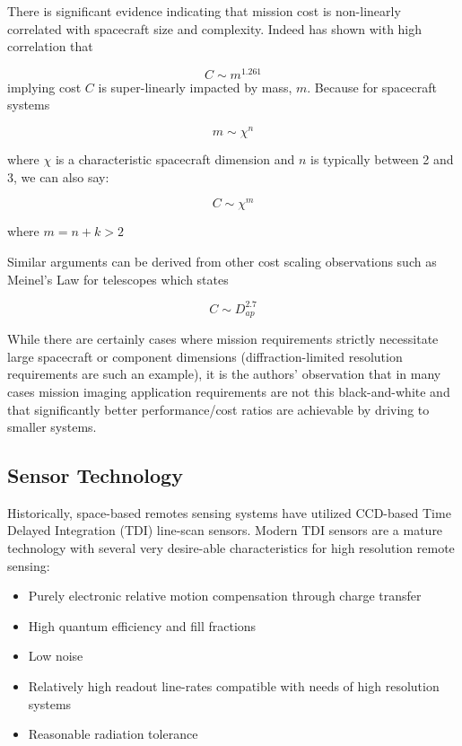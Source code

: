 \documentclass[10pt,journal]{IEEEtran}  %
\begin{document}
There is significant evidence indicating that mission cost is non-linearly correlated with spacecraft size and complexity.  Indeed \cite{bearden} has shown with high correlation that 

$$C \sim m^1.261$$
implying cost $C$ is super-linearly impacted by mass, $m$.  Because for spacecraft systems

$$m \sim \chi^n$$

where $\chi$ is a characteristic spacecraft dimension and $n$ is typically between 2 and 3, we can also say:

\begin{equation}
C \sim \chi^m
\end{equation}

where $m = n + k > 2$

Similar arguments can be derived from other cost scaling observations such as Meinel's Law for telescopes which states

$$C \sim D_{ap}^{2.7}$$

While there are certainly cases where mission requirements strictly necessitate large spacecraft or component dimensions (diffraction-limited resolution requirements are such an example), it is the authors' observation that in many cases mission imaging application requirements are not this black-and-white and that significantly better performance/cost ratios are achievable by driving to smaller systems.

\subsection{Sensor Technology}
\label{sec:sensor_trends}

Historically, space-based remotes sensing systems have utilized CCD-based Time Delayed Integration (TDI) line-scan sensors.  Modern TDI sensors are a mature technology with several very desire-able characteristics for high resolution remote sensing:

\begin{itemize}
    \item Purely electronic relative motion compensation through charge transfer
    \item High quantum efficiency and fill fractions
    \item Low noise
    \item Relatively high readout line-rates compatible with needs of high resolution systems
    \item Reasonable radiation tolerance
\end{itemize}
\end{document}

